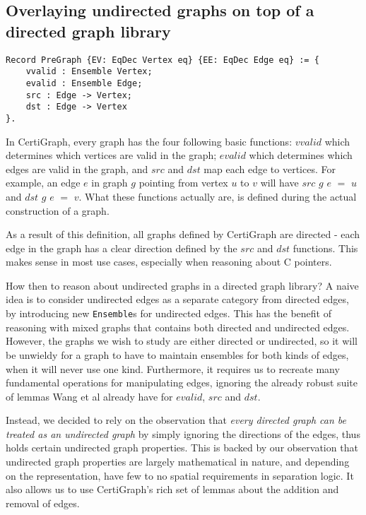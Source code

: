 \subsection{Overlaying undirected graphs on top of a directed graph library}

\begin{lstlisting}
Record PreGraph {EV: EqDec Vertex eq} {EE: EqDec Edge eq} := {
	vvalid : Ensemble Vertex;
	evalid : Ensemble Edge;
	src : Edge -> Vertex;
	dst : Edge -> Vertex
}.
\end{lstlisting}
In CertiGraph, every graph has the four following basic functions: $vvalid$ which determines which vertices are valid in the graph; $evalid$ which determines which edges are valid in the graph, and $src$ and $dst$ map each edge to vertices. For example, an edge $e$ in graph $g$ pointing from vertex $u$ to $v$ will have $src$ $g$ $e$ $=$ $u$ and $dst$ $g$ $e$ $=$ $v$. What these functions actually are, is defined during the actual construction of a graph.

As a result of this definition, all graphs defined by CertiGraph are directed - each edge in the graph has a clear direction defined by the $src$ and $dst$ functions. This makes sense in most use cases, especially when reasoning about C pointers.

How then to reason about undirected graphs in a directed graph library? A naive idea is to consider undirected edges as a separate category from directed edges, by introducing new \texttt{Ensemble}s for undirected edges. This has the benefit of reasoning with mixed graphs that contains both directed and undirected edges. However, the graphs we wish to study are either directed or undirected, so it will be unwieldy for a graph to have to maintain ensembles for both kinds of edges, when it will never use one kind. Furthermore, it requires us to recreate many fundamental operations for manipulating edges, ignoring the already robust suite of lemmas Wang et al already have for $evalid$, $src$ and $dst$.

Instead, we decided to rely on the observation that \textit{every directed graph can be treated as an undirected graph} by simply ignoring the directions of the edges, thus holds certain undirected graph properties. This is backed by our observation that undirected graph properties are largely mathematical in nature, and depending on the representation, have few to no spatial requirements in separation logic. It also allows us to use CertiGraph's rich set of lemmas about the addition and removal of edges.

